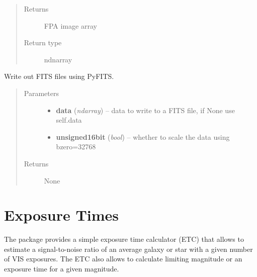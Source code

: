\documentclass[a4paper,11pt,english]{sphinxmanual}
\begin{document}
\begin{fulllineitems}
\begin{fulllineitems}
\begin{quote}
\begin{description}
\begin{itemize}
\end{itemize}

\item[{Returns}] \leavevmode
FPA image array

\item[{Return type}] \leavevmode
ndnarray

\end{description}\end{quote}

\end{fulllineitems}


\begin{fulllineitems}
\label{postproc:postproc.tileFPA.tileFPA.writeFITSfile}
Write out FITS files using PyFITS.
\begin{quote}\begin{description}
\item[{Parameters}] \leavevmode\begin{itemize}
\item {} 
\textbf{data} (\emph{ndarray}) -- data to write to a FITS file, if None use self.data

\item {} 
\textbf{unsigned16bit} (\emph{bool}) -- whether to scale the data using bzero=32768

\end{itemize}

\item[{Returns}] \leavevmode
None

\end{description}\end{quote}

\end{fulllineitems}


\end{fulllineitems}



\chapter{Exposure Times}
\label{index:exposure-times}
The package provides a simple exposure time calculator (ETC) that allows to estimate a signal-to-noise ratio
of an average galaxy or star with a given number of VIS exposures. The ETC also allows to calculate limiting
magnitude or an exposure time for a given magnitude.
\end{document}
